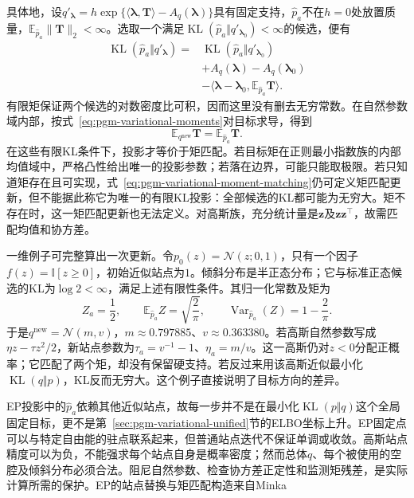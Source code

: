 具体地，设$q'_{\bm{\lambda}}=h\exp\{\langle\bm{\lambda},\bm T\rangle-A_q(\bm{\lambda})\}$具有固定支持，$\widehat p_a$不在$h=0$处放置质量，$\mathbb E_{\widehat p_a}\lVert\bm T\rVert_2<\infty$。选取一个满足$\operatorname{KL}(\widehat p_a\Vert q'_{\bm{\lambda}_0})<\infty$的候选，便有
\[
  \begin{aligned}
    \operatorname{KL}(\widehat p_a\Vert q'_{\bm{\lambda}})
      ={}&\operatorname{KL}(\widehat p_a\Vert q'_{\bm{\lambda}_0})\\
       &+A_q(\bm{\lambda})-A_q(\bm{\lambda}_0)\\
       &-\langle\bm{\lambda}-\bm{\lambda}_0,
                  \mathbb E_{\widehat p_a}\bm T\rangle.
  \end{aligned}
\]
有限矩保证两个候选的对数密度比可积，因而这里没有删去无穷常数。在自然参数域内部，按式~\eqref{eq:pgm-variational-moments}对目标求导，得到
\begin{equation}
  \mathbb E_{q^{\mathrm{new}}}\bm T
     =\mathbb E_{\widehat p_a}\bm T.
  \label{eq:pgm-variational-moment-matching}
\end{equation}
在这些有限KL条件下，投影才等价于矩匹配。若目标矩在正则最小指数族的内部均值域中，严格凸性给出唯一的投影参数；若落在边界，可能只能取极限。若只知道矩存在且可实现，式~\eqref{eq:pgm-variational-moment-matching}仍可定义矩匹配更新，但不能据此称它为唯一的有限KL投影：全部候选的KL都可能为无穷大。矩不存在时，这一矩匹配更新也无法定义。对高斯族，充分统计量是$\bm z$及$\bm z\bm z^\top$，故需匹配均值和协方差。

一维例子可完整算出一次更新。令$p_0(z)=\mathcal N(z;0,1)$，只有一个因子$f(z)=\mathbb I[z\geq0]$，初始近似站点为$1$。倾斜分布是半正态分布；它与标准正态候选的KL为$\log2<\infty$，满足上述有限性条件。其归一化常数及矩为
\[
  Z_a=\frac12,\qquad
  \mathbb E_{\widehat p_a}Z=\sqrt{\frac2\pi},\qquad
  \operatorname{Var}_{\widehat p_a}(Z)=1-\frac2\pi.
\]
于是$q^{\mathrm{new}}=\mathcal N(m,v)$，$m\approx0.797885$、$v\approx0.363380$。若高斯自然参数写成$\eta z-\tau z^2/2$，新站点参数为$\tau_a=v^{-1}-1$、$\eta_a=m/v$。这一高斯仍对$z<0$分配正概率；它匹配了两个矩，却没有保留硬支持。若反过来用该高斯近似最小化$\operatorname{KL}(q\Vert p)$，KL反而无穷大。这个例子直接说明了目标方向的差异。

EP投影中的$\widehat p_a$依赖其他近似站点，故每一步并不是在最小化$\operatorname{KL}(p\Vert q)$这个全局固定目标，更不是第~\ref{sec:pgm-variational-unified}节的ELBO坐标上升。EP固定点可以与特定自由能的驻点联系起来，但普通站点迭代不保证单调或收敛。高斯站点精度可以为负，不能强求每个站点自身是概率密度；然而总体$q$、每个被使用的空腔及倾斜分布必须合法。阻尼自然参数、检查协方差正定性和监测矩残差，是实际计算所需的保护。EP的站点替换与矩匹配构造来自Minka

